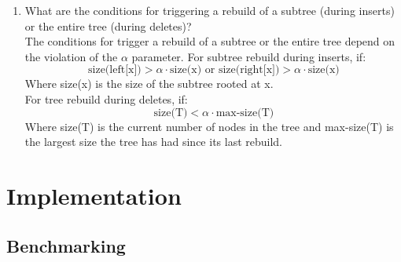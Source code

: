 \documentclass{labReport}
\begin{document}
\begin{enumerate}
    \item What are the conditions for triggering a rebuild of a subtree (during inserts) or the entire tree (during deletes)?\\
    The conditions for trigger a rebuild of a subtree or the entire tree depend on the violation of the $\alpha$ parameter. For subtree rebuild during inserts, if: \\
    \[
    \text{size(left[x])} > \alpha \cdot \text{size(x)} \text{ or } \text{size(right[x])} > \alpha \cdot \text{size(x)}
    \]
    Where size(x) is the size of the subtree rooted at x. \\
    For tree rebuild during deletes, if: \\
    \[
    \text{size(T)} < \alpha \cdot \text{max-size(T)}
    \]
    Where size(T) is the current number of nodes in the tree and max-size(T) is the largest size the tree has had since its last rebuild.

\end{enumerate}

\section{Implementation}



\subsection{Benchmarking}
\end{document}
